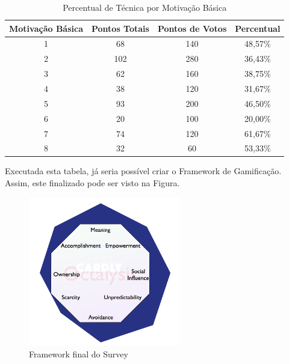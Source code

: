 \begin{table}[]
    \centering
    \caption{Percentual de Técnica por Motivação Básica}
    \label{tab:percentual_tecnica_motivacao}
    \begin{tabular}{@{}cccc@{}}
        \toprule
        Motivação Básica & Pontos Totais & Pontos de Votos & Percentual \\ \midrule
        1         & 68            & 140             & 48,57\%    \\
        2         & 102           & 280             & 36,43\%    \\
        3         & 62            & 160             & 38,75\%    \\
        4         & 38            & 120             & 31,67\%    \\
        5         & 93            & 200             & 46,50\%    \\
        6         & 20            & 100             & 20,00\%    \\
        7         & 74            & 120             & 61,67\%    \\
        8         & 32            & 60              & 53,33\%    \\ \bottomrule
    \end{tabular}
\end{table}

Executada esta tabela, já seria possível criar o Framework de Gamificação. Assim,
este finalizado pode ser visto na Figura.

\begin{figure}[h]
    \centering

    \includegraphics[width=250px, scale=1]{figuras/final_survey}
    \caption{Framework final do Survey}

    \label{fig:final_framework_octalisys}
\end{figure}

